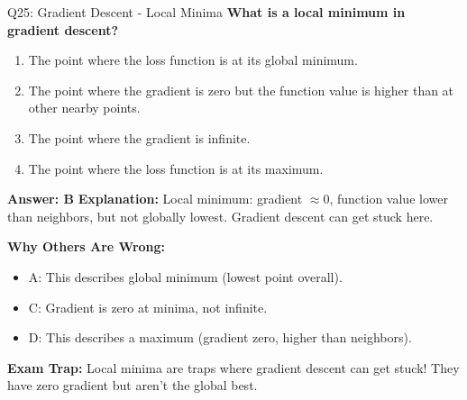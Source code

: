 \documentclass[8pt]{beamer}
\begin{document}
	\begin{frame}{Q25: Gradient Descent - Local Minima}
		\fontsize{6.5}{7.5}\selectfont
		\textbf{What is a local minimum in gradient descent?}
		
		\begin{enumerate}
			\item The point where the loss function is at its global minimum.
			\item The point where the gradient is zero but the function value is higher than at other nearby points.
			\item The point where the gradient is infinite.
			\item The point where the loss function is at its maximum.
		\end{enumerate}
		
		\vspace{0.05cm}
		\textcolor{myblue}{\textbf{Answer: B}}
		\vspace{0.05cm}
		\textcolor{myblue}{\textbf{Explanation:}} Local minimum: gradient $\approx 0$, function value lower than neighbors, but not globally lowest. Gradient descent can get stuck here.
		
		\vspace{0.05cm}
		\textcolor{myred}{\textbf{Why Others Are Wrong:}}
		\begin{itemize}
			\item \textcolor{myred}{A:} This describes global minimum (lowest point overall).
			\item \textcolor{myred}{C:} Gradient is zero at minima, not infinite.
			\item \textcolor{myred}{D:} This describes a maximum (gradient zero, higher than neighbors).
		\end{itemize}
		
		\textcolor{myred}{\textbf{Exam Trap:}} Local minima are \textcolor{myred}{traps} where gradient descent can get stuck! They have zero gradient but aren't the global best.
	\end{frame}
	
\end{document}
